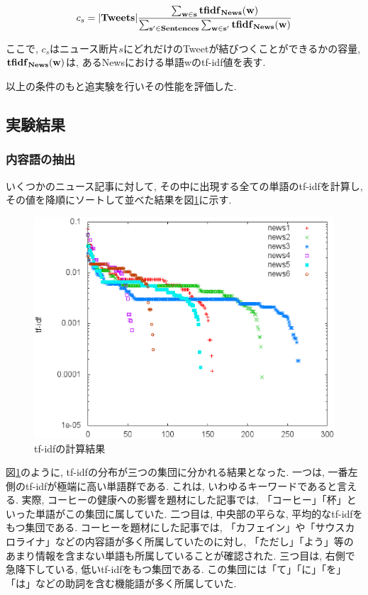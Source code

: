 \documentclass[12pt]{jarticle}
\begin{document}
\begin{equation}
  c_{s} =  |\bf{Tweets}| \frac{\sum _{w \in s} \bf{tfidf}_{News}(w)}{\sum _{s' \in \bf{Sentences}} \sum _{w \in s'} \bf{tfidf}_{News}(w)}
\end{equation}

ここで, $c_s$はニュース断片$s$にどれだけのTweetが結びつくことができるかの容量, $\bf{tfidf}_{News}(w)$は, あるNewsにおける単語wのtf-idf値を表す. 

以上の条件のもと追実験を行いその性能を評価した. 

\subsection{実験結果}
\subsubsection{内容語の抽出}

いくつかのニュース記事に対して, その中に出現する全ての単語のtf-idfを計算し, その値を降順にソートして並べた結果を図\ref{content_word}に示す. 

\begin{figure}[htbp]
  \begin{center}
    \includegraphics[scale = 0.5]{image/content_word.eps}
  \end{center}
  \label{content_word}
  \caption{tf-idfの計算結果}

\end{figure}

図\ref{content_word}のように, tf-idfの分布が三つの集団に分かれる結果となった. 一つは, 一番左側のtf-idfが極端に高い単語群である. これは, いわゆるキーワードであると言える. 実際, コーヒーの健康への影響を題材にした記事では, 「コーヒー」「杯」といった単語がこの集団に属していた. 二つ目は, 中央部の平らな, 平均的なtf-idfをもつ集団である. コーヒーを題材にした記事では, 「カフェイン」や「サウスカロライナ」などの内容語が多く所属していたのに対し, 「ただし」「よう」等のあまり情報を含まない単語も所属していることが確認された. 三つ目は, 右側で急降下している, 低いtf-idfをもつ集団である. この集団には「て」「に」「を」「は」などの助詞を含む機能語が多く所属していた. 
\end{document}

